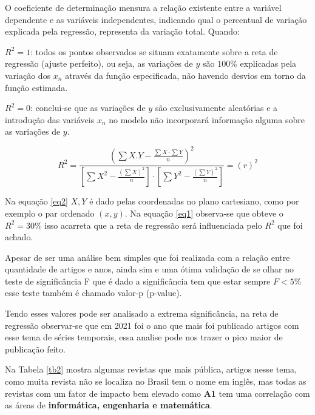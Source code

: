 O coeficiente de determinação mensura a relação existente entre a variável dependente e as variáveis independentes, indicando qual o percentual de variação explicada pela regressão, representa da variação total. Quando:

$R^2=1$: todos os pontos observados se situam exatamente sobre a reta de regressão (ajuste perfeito), ou seja, as variações de $y$ são $100\%$ explicadas pela variação dos $x_n$ através da função especificada, não havendo desvios em torno da função estimada. 

$R^2=0$: conclui-se que as variações de $y$ são exclusivamente aleatórias e a introdução das variáveis $x_n$ no modelo não incorporará informação alguma sobre as variações de $y$.

\begin{equation}
	R^{2}=\frac{\left(\sum X . Y-\frac{\sum X \cdot \sum Y}{n}\right)^{2}}{\left[\sum X^{2}-\frac{\left(\sum X\right)^{2}}{n}\right] \cdot\left[\sum Y^{2}-\frac{\left(\sum Y\right)^{2}}{n}\right]}=(r)^{2}\label{eq2}
\end{equation}

Na equação \eqref{eq2} $X,Y$ é dado pelas coordenadas no plano cartesiano, como por exemplo o par ordenado $(x,y)$. 
Na equação \eqref{eq1} observa-se que obteve o $R^2=30\%$ isso acarreta que a reta de regressão será influenciada pelo $R^2$ que foi achado.

Apesar de ser uma análise bem simples que foi realizada com a relação entre quantidade de artigos e anos, ainda sim e uma ótima validação de se olhar no teste de significância F que é dado a significância tem que estar sempre $F<5\%$ esse teste também é chamado valor-p (p-value).

Tendo esses valores pode ser analisado a extrema significância, na reta de regressão observar-se que em 2021 foi o ano que mais foi publicado artigos com esse tema de séries temporais, essa analise pode nos trazer o pico maior de publicação feito.




Na Tabela \ref{tb2} mostra algumas revistas que mais pública, artigos nesse tema, como muita revista não se localiza no Brasil tem o nome em inglês, mas todas as revistas com um fator de impacto bem elevado como \textbf{A1} tem uma correlação com as áreas de \textbf{informática, engenharia e matemática}.






